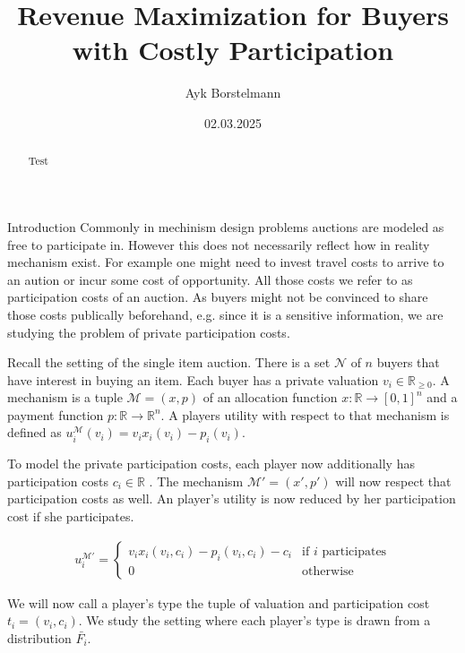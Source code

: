 \documentclass[11pt,a4paper]{article}
\author{Ayk Borstelmann}
\title{Revenue Maximization for Buyers with Costly Participation}
\date{02.03.2025}
\newcommand{\RR}{\ensuremath{\mathbb{R}}}
\begin{document}
\maketitle

\begin{abstract}
    Test
\end{abstract}

\begin{section}{Introduction}
 Commonly in mechinism design problems auctions are modeled as free to participate in.
 However this does not necessarily reflect how in reality mechanism exist.
 For example one might need to invest travel costs to arrive to an aution or incur some cost of opportunity.
 All those costs we refer to as participation costs of an auction.
 As buyers might not be convinced to share those costs publically beforehand, e.g. since it is a sensitive information, we are studying the problem of private participation costs.

 Recall the setting of the single item auction.
 There is a set $\mathcal{N}$ of $n$ buyers that have interest in buying an item.
 Each buyer has a private valuation $v_i \in \RR_{\geq 0}$.
 A mechanism is a tuple $\mathcal{M} = (x,p)$ of an allocation function $x: \RR \rightarrow [0,1]^n$ and a payment function $p: \RR \rightarrow \RR^n$.
 A players utility with respect to that mechanism is defined as $u_i^\mathcal{M}(v_i) = v_i x_i(v_i) - p_i(v_i)$.

 To model the private participation costs, each player now additionally has participation costs $c_i \in \RR$ \cite{primary}.
 The mechanism $\mathcal{M}' = (x', p')$ will now respect that participation costs as well.
 An player's utility is now reduced by her participation cost if she participates.

 \begin{align*}
     u_i^{\mathcal{M}'} = \begin{cases}
                              v_i x_i(v_i, c_i) - p_i(v_i, c_i) - c_i & \text{if $i$ participates} \\
                              0                                       & \text{otherwise}
                          \end{cases}
 \end{align*}

 We will now call a player's type the tuple of valuation and participation cost $t_i = (v_i, c_i)$.
 We study the setting where each player's type is drawn from a distribution $\bar{F_i}$.
\end{section}
\end{document}
